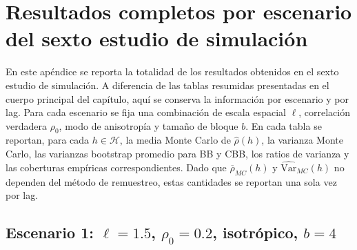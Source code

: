 %

\section{Resultados completos por escenario del sexto estudio de simulación}
\label{ap:resultados_completos_sexto_estudio}

En este apéndice se reporta la totalidad de los resultados obtenidos en el sexto estudio de simulación. A diferencia de las tablas resumidas presentadas en el cuerpo principal del capítulo, aquí se conserva la información por escenario y por lag. Para cada escenario se fija una combinación de escala espacial \(\ell\), correlación verdadera \(\rho_0\), modo de anisotropía y tamaño de bloque \(b\). En cada tabla se reportan, para cada \(h\in\mathcal{H}\), la media Monte Carlo de \(\widehat{\rho}(h)\), la varianza Monte Carlo, las varianzas bootstrap promedio para BB y CBB, los ratios de varianza y las coberturas empíricas correspondientes. Dado que \(\overline{\rho}_{MC}(h)\) y \(\widehat{\mathrm{Var}}_{MC}(h)\) no dependen del método de remuestreo, estas cantidades se reportan una sola vez por lag.


\subsection{Escenario 1: $\ell=1.5$, $\rho_0=0.2$, isotrópico, $b=4$}

